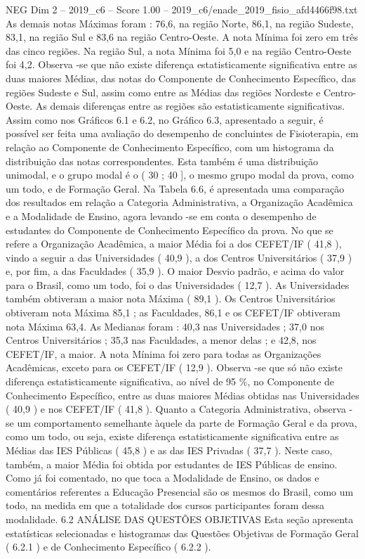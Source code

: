 \begin{textsample}{NEG Dim 2 – 2019\_c6 – Score 1.00 – 2019\_c6/enade\_2019\_fisio\_afd4466f98.txt}
As demais notas Máximas foram : 76,6, na região Norte, 86,1, na região Sudeste, 83,1, na região Sul e 83,6 na região Centro-Oeste.
A nota Mínima foi zero em três das cinco regiões.
Na região Sul, a nota Mínima foi 5,0 e na região Centro-Oeste foi 4,2.
Observa -se que não existe diferença estatisticamente significativa entre as duas maiores Médias, das notas do Componente de Conhecimento Específico, das regiões Sudeste e Sul, assim como entre as Médias das regiões Nordeste e Centro-Oeste.
As demais diferenças entre as regiões são estatisticamente significativas.
Assim como nos Gráficos 6.1 e 6.2, no Gráfico 6.3, apresentado a seguir, é possível ser feita uma avaliação do desempenho de concluintes de Fisioterapia, em relação ao Componente de Conhecimento Específico, com um histograma da distribuição das notas correspondentes.
Esta também é uma distribuição unimodal, e o grupo modal é o ( 30 ; 40 ], o mesmo grupo modal da prova, como um todo, e de Formação Geral.
Na Tabela 6.6, é apresentada uma comparação dos resultados em relação a Categoria Administrativa, a Organização Acadêmica e a Modalidade de Ensino, agora levando -se em conta o desempenho de estudantes do Componente de Conhecimento Específico da prova.
No que se refere a Organização Acadêmica, a maior Média foi a dos CEFET/IF ( 41,8 ), vindo a seguir a das Universidades ( 40,9 ), a dos Centros Universitários ( 37,9 ) e, por fim, a das Faculdades ( 35,9 ).
O maior Desvio padrão, e acima do valor para o Brasil, como um todo, foi o das Universidades ( 12,7 ).
As Universidades também obtiveram a maior nota Máxima ( 89,1 ).
Os Centros Universitários obtiveram nota Máxima 85,1 ; as Faculdades, 86,1 e os CEFET/IF obtiveram nota Máxima 63,4.
As Medianas foram : 40,3 nas Universidades ; 37,0 nos Centros Universitários ; 35,3 nas Faculdades, a menor delas ; e 42,8, nos CEFET/IF, a maior.
A nota Mínima foi zero para todas as Organizações Acadêmicas, exceto para os CEFET/IF ( 12,9 ).
Observa -se que só não existe diferença estatisticamente significativa, ao nível de 95 \%, no Componente de Conhecimento Específico, entre as duas maiores Médias obtidas nas Universidades ( 40,9 ) e nos CEFET/IF ( 41,8 ).
Quanto a Categoria Administrativa, observa -se um comportamento semelhante àquele da parte de Formação Geral e da prova, como um todo, ou seja, existe diferença estatisticamente significativa entre as Médias das IES Públicas ( 45,8 ) e as das IES Privadas ( 37,7 ).
Neste caso, também, a maior Média foi obtida por estudantes de IES Públicas de ensino.
Como já foi comentado, no que toca a Modalidade de Ensino, os dados e comentários referentes a Educação Presencial são os mesmos do Brasil, como um todo, na medida em que a totalidade dos cursos participantes foram dessa modalidade. 6.2 ANÁLISE DAS QUESTÕES OBJETIVAS Esta seção apresenta estatísticas selecionadas e histogramas das Questões Objetivas de Formação Geral ( 6.2.1 ) e de Conhecimento Específico ( 6.2.2 ).

\end{textsample}
